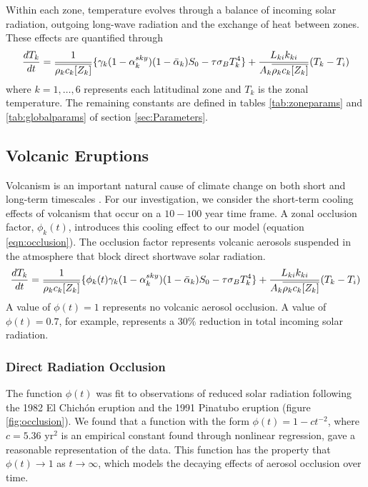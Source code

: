 \documentclass[12pt]{article}
\newcommand*\mean[1]{\overline{#1}}
\begin{document}
Within each zone, temperature evolves through a balance of incoming solar radiation,
outgoing long-wave radiation and the exchange of heat between zones.
These effects are quantified through
\begin{equation} \label{eqn:budyko}
    \frac{dT_k}{dt} = \frac{1}{\mean{\rho_kc_k[Z_k]}}
    \{
      \gamma_k(1-\alpha_k^{sky})(1-\Bar{\alpha}_k)S_0-\tau\sigma_BT_k^{4}
    \} +
    \frac{L_{ki}k_{ki}}{{A_k}\mean{\rho_kc_k[Z_k]}}(T_{k}-T_{i})
\end{equation}
where $k = 1,\dots,6$ represents each latitudinal zone and $T_k$ is the zonal
temperature. The remaining constants are defined in tables \ref{tab:zoneparams}
and \ref{tab:globalparams} of section \ref{sec:Parameters}.

\subsection{Volcanic Eruptions} \label{sec:Volcanos}
Volcanism is an important natural cause of climate change on both short and long-term
timescales \parencite{robock}. For our investigation, we consider the
short-term cooling effects of volcanism that occur on a $10-100$ year time frame.
A zonal occlusion factor, $\phi_k(t)$, introduces this cooling effect to our model
(equation \ref{eqn:occlusion}). The occlusion factor represents volcanic aerosols
suspended in the atmosphere that block direct shortwave solar radiation.
\begin{equation} \label{eqn:occlusion}
\frac{dT_k}{dt} = \frac{1}{\mean{\rho_kc_k[Z_k]}}
\{
    \phi_k(t)\gamma_k(1-\alpha_k^{sky})(1-\Bar{\alpha}_k)S_0-\tau\sigma_BT_k^{4}
\} +
\frac{L_{ki}k_{ki}}{{A_k}\mean{\rho_kc_k[Z_k]}}(T_{k}-T_{i})
\end{equation}
A value of $\phi(t) = 1$ represents no volcanic aerosol occlusion. A value
of $\phi(t) = 0.7$, for example, represents a $30\%$ reduction in total
incoming solar radiation.

\subsubsection{Direct Radiation Occlusion} \label{sec:Occlusion}
The function $\phi(t)$ was fit to observations of reduced solar radiation following the
1982 El Chichón eruption and the 1991 Pinatubo eruption \parencite{robock} (figure
\ref{fig:occlusion}). We found that a function with the form
$\phi(t) = 1 - ct^{-2}$, where $c=5.36$ yr$^2$ is an empirical constant found through
nonlinear regression, gave a reasonable representation of the data.
This function has the property that $\phi(t) \to 1$ as $t \to \infty$,
which models the decaying effects of aerosol occlusion over time.
\end{document}
